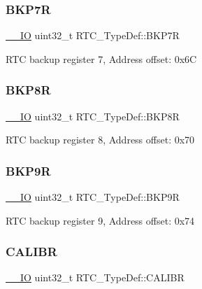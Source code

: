 \subsubsection{\texorpdfstring{B\+K\+P7R}{BKP7R}}
{\footnotesize\ttfamily \hyperlink{core__sc300_8h_aec43007d9998a0a0e01faede4133d6be}{\+\_\+\+\_\+\+IO} uint32\+\_\+t R\+T\+C\+\_\+\+Type\+Def\+::\+B\+K\+P7R}

R\+TC backup register 7, Address offset\+: 0x6C \mbox{\label{struct_r_t_c___type_def_a0e7fca11f1c953270ee0ee6028860add}} 
\subsubsection{\texorpdfstring{B\+K\+P8R}{BKP8R}}
{\footnotesize\ttfamily \hyperlink{core__sc300_8h_aec43007d9998a0a0e01faede4133d6be}{\+\_\+\+\_\+\+IO} uint32\+\_\+t R\+T\+C\+\_\+\+Type\+Def\+::\+B\+K\+P8R}

R\+TC backup register 8, Address offset\+: 0x70 \mbox{\label{struct_r_t_c___type_def_abadf1ac26350bf00575428be6a05708b}} 
\subsubsection{\texorpdfstring{B\+K\+P9R}{BKP9R}}
{\footnotesize\ttfamily \hyperlink{core__sc300_8h_aec43007d9998a0a0e01faede4133d6be}{\+\_\+\+\_\+\+IO} uint32\+\_\+t R\+T\+C\+\_\+\+Type\+Def\+::\+B\+K\+P9R}

R\+TC backup register 9, Address offset\+: 0x74 \mbox{\label{struct_r_t_c___type_def_a2403d29b2bfffb734ebef6642c0d2724}} 
\subsubsection{\texorpdfstring{C\+A\+L\+I\+BR}{CALIBR}}
{\footnotesize\ttfamily \hyperlink{core__sc300_8h_aec43007d9998a0a0e01faede4133d6be}{\+\_\+\+\_\+\+IO} uint32\+\_\+t R\+T\+C\+\_\+\+Type\+Def\+::\+C\+A\+L\+I\+BR}

